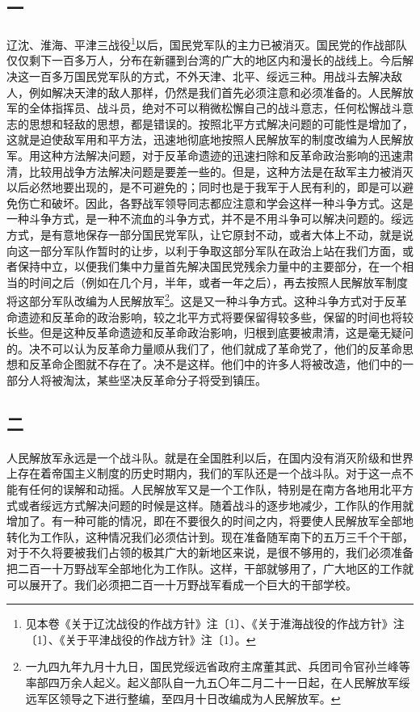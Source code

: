 \documentclass[cn,11pt,chinese]{elegantbook}
\def\myformat#1{\hfil\hfil #1}
\begin{document}
\subsection*{\myformat{一 }}
辽沈、淮海、平津三战役\footnote[1]{ 见本卷《关于辽沈战役的作战方针》注〔1〕、《关于淮海战役的作战方针》注〔1〕、《关于平津战役的作战方针》注〔1〕。}以后，国民党军队的主力已被消灭。国民党的作战部队仅仅剩下一百多万人，分布在新疆到台湾的广大的地区内和漫长的战线上。今后解决这一百多万国民党军队的方式，不外天津、北平、绥远三种。用战斗去解决敌人，例如解决天津的敌人那样，仍然是我们首先必须注意和必须准备的。人民解放军的全体指挥员、战斗员，绝对不可以稍微松懈自己的战斗意志，任何松懈战斗意志的思想和轻敌的思想，都是错误的。按照北平方式解决问题的可能性是增加了，这就是迫使敌军用和平方法，迅速地彻底地按照人民解放军的制度改编为人民解放军。用这种方法解决问题，对于反革命遗迹的迅速扫除和反革命政治影响的迅速肃清，比较用战争方法解决问题是要差一些的。但是，这种方法是在敌军主力被消灭以后必然地要出现的，是不可避免的；同时也是于我军于人民有利的，即是可以避免伤亡和破坏。因此，各野战军领导同志都应注意和学会这样一种斗争方式。这是一种斗争方式，是一种不流血的斗争方式，并不是不用斗争可以解决问题的。绥远方式，是有意地保存一部分国民党军队，让它原封不动，或者大体上不动，就是说向这一部分军队作暂时的让步，以利于争取这部分军队在政治上站在我们方面，或者保持中立，以便我们集中力量首先解决国民党残余力量中的主要部分，在一个相当的时间之后（例如在几个月，半年，或者一年之后），再去按照人民解放军制度将这部分军队改编为人民解放军\footnote[2]{ 一九四九年九月十九日，国民党绥远省政府主席董其武、兵团司令官孙兰峰等率部四万余人起义。起义部队自一九五〇年二月二十一日起，在人民解放军绥远军区领导之下进行整编，至四月十日改编成为人民解放军。}。这是又一种斗争方式。这种斗争方式对于反革命遗迹和反革命的政治影响，较之北平方式将要保留得较多些，保留的时间也将较长些。但是这种反革命遗迹和反革命政治影响，归根到底要被肃清，这是毫无疑问的。决不可以认为反革命力量顺从我们了，他们就成了革命党了，他们的反革命思想和反革命企图就不存在了。决不是这样。他们中的许多人将被改造，他们中的一部分人将被淘汰，某些坚决反革命分子将受到镇压。\\
\subsection*{\myformat{二 }}
人民解放军永远是一个战斗队。就是在全国胜利以后，在国内没有消灭阶级和世界上存在着帝国主义制度的历史时期内，我们的军队还是一个战斗队。对于这一点不能有任何的误解和动摇。人民解放军又是一个工作队，特别是在南方各地用北平方式或者绥远方式解决问题的时候是这样。随着战斗的逐步地减少，工作队的作用就增加了。有一种可能的情况，即在不要很久的时间之内，将要使人民解放军全部地转化为工作队，这种情况我们必须估计到。现在准备随军南下的五万三千个干部，对于不久将要被我们占领的极其广大的新地区来说，是很不够用的，我们必须准备把二百一十万野战军全部地化为工作队。这样，干部就够用了，广大地区的工作就可以展开了。我们必须把二百一十万野战军看成一个巨大的干部学校。\\
\end{document}

